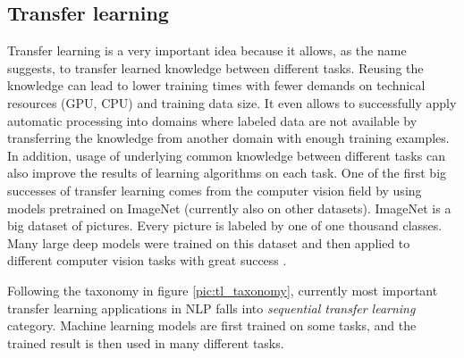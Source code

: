 \subsection{Transfer learning}
\label{sub:models}
Transfer learning is a very important idea because it allows, as the name suggests, to transfer learned knowledge between different tasks. 
Reusing the knowledge can lead to lower training times with fewer demands on technical resources (GPU, CPU) and training data size. It even allows to successfully apply automatic processing into domains where labeled data are not available by transferring the knowledge from another domain with enough training examples. In addition, usage of underlying common knowledge between different tasks can also improve the results of learning algorithms on each task. %
One of the first big successes of transfer learning comes from the computer vision field by using models pretrained on ImageNet (currently also on other datasets). ImageNet \citep{Russakovsky2015} is a big dataset of pictures. Every picture is labeled by one of one thousand classes. Many large deep models were trained on this dataset and then applied to different computer vision tasks with great success \citep{Huh}.  %
\par
Following the taxonomy in figure \ref{pic:tl_taxonomy}, currently most important transfer learning applications in NLP falls into \textit{sequential transfer learning} category. Machine learning models are first trained on some tasks, and the trained result is then used in many different tasks.
